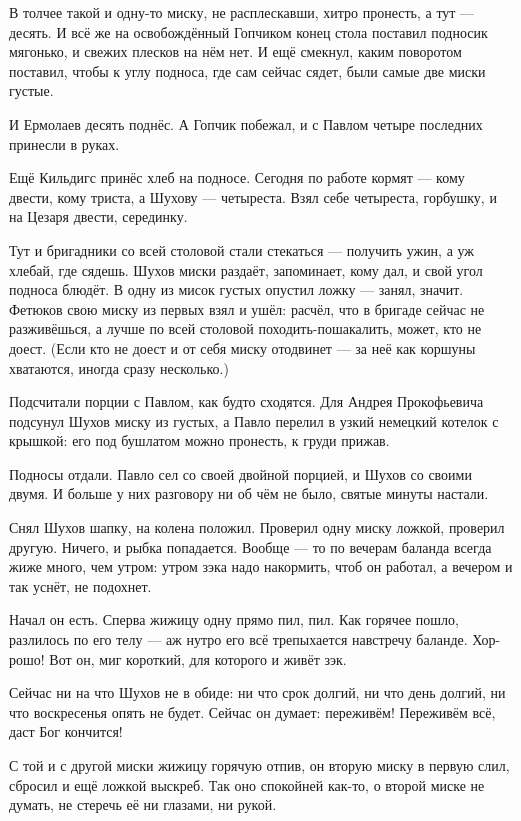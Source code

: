 В толчее такой и одну-то миску, не расплескавши, хитро пронесть, а тут --- десять. И всё же на освобождённый Гопчиком конец стола поставил подносик мягонько, и свежих плесков на нём нет. И ещё смекнул, каким поворотом поставил, чтобы к углу подноса, где сам сейчас сядет, были самые две миски густые.

И Ермолаев десять поднёс. А Гопчик побежал, и с Павлом четыре последних принесли в руках.

Ещё Кильдигс принёс хлеб на подносе. Сегодня по работе кормят --- кому двести, кому триста, а Шухову --- четыреста. Взял себе четыреста, горбушку, и на Цезаря двести, серединку.

Тут и бригадники со всей столовой стали стекаться --- получить ужин, а уж хлебай, где сядешь. Шухов миски раздаёт, запоминает, кому дал, и свой угол подноса блюдёт. В одну из мисок густых опустил ложку --- занял, значит. Фетюков свою миску из первых взял и ушёл: расчёл, что в бригаде сейчас не разживёшься, а лучше по всей столовой походить-пошакалить, может, кто не доест. (Если кто не доест и от себя миску отодвинет --- за неё как коршуны хватаются, иногда сразу несколько.)

Подсчитали порции с Павлом, как будто сходятся. Для Андрея Прокофьевича подсунул Шухов миску из густых, а Павло перелил в узкий немецкий котелок с крышкой: его под бушлатом можно пронесть, к груди прижав.

Подносы отдали. Павло сел со своей двойной порцией, и Шухов со своими двумя. И больше у них разговору ни об чём не было, святые минуты настали.

Снял Шухов шапку, на колена положил. Проверил одну миску ложкой, проверил другую. Ничего, и рыбка попадается. Вообще --- то по вечерам баланда всегда жиже много, чем утром: утром зэка надо накормить, чтоб он работал, а вечером и так уснёт, не подохнет.

Начал он есть. Сперва жижицу одну прямо пил, пил. Как горячее пошло, разлилось по его телу --- аж нутро его всё трепыхается навстречу баланде. Хор-рошо! Вот он, миг короткий, для которого и живёт зэк.

Сейчас ни на что Шухов не в обиде: ни что срок долгий, ни что день долгий, ни что воскресенья опять не будет. Сейчас он думает: переживём! Переживём всё, даст Бог кончится!

С той и с другой миски жижицу горячую отпив, он вторую миску в первую слил, сбросил и ещё ложкой выскреб. Так оно спокойней как-то, о второй миске не думать, не стеречь её ни глазами, ни рукой.


